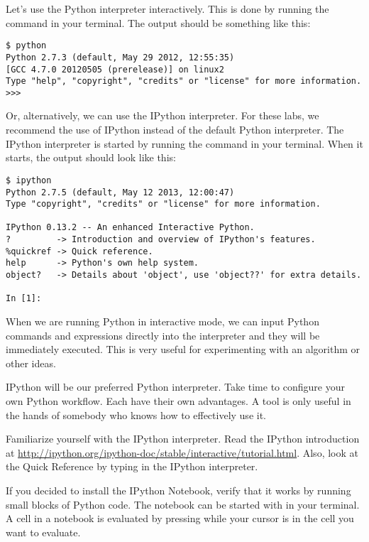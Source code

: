 Let's use the Python interpreter interactively.
This is done by running the command  in your terminal.
The output should be something like this:
\begin{lstlisting}
$ python
Python 2.7.3 (default, May 29 2012, 12:55:35)
[GCC 4.7.0 20120505 (prerelease)] on linux2
Type "help", "copyright", "credits" or "license" for more information.
>>>
\end{lstlisting}
Or, alternatively, we can use the IPython interpreter.
For these labs, we recommend the use of IPython instead of the default Python interpreter.
The IPython interpreter is started by running the command  in your terminal.
When it starts, the output should look like this:
\begin{lstlisting}
$ ipython
Python 2.7.5 (default, May 12 2013, 12:00:47)
Type "copyright", "credits" or "license" for more information.

IPython 0.13.2 -- An enhanced Interactive Python.
?         -> Introduction and overview of IPython's features.
%quickref -> Quick reference.
help      -> Python's own help system.
object?   -> Details about 'object', use 'object??' for extra details.

In [1]:
\end{lstlisting}
When we are running Python in interactive mode, we can input Python commands and expressions directly into the interpreter and they will be immediately executed.
This is very useful for experimenting with an algorithm or other ideas.

IPython will be our preferred Python interpreter.  Take time to configure your own Python
workflow.  Each have their own advantages.  A tool is only useful in the hands of somebody
who knows how to effectively use it.
\begin{problem}
Familiarize yourself with the IPython interpreter.
Read the IPython introduction at \url{http://ipython.org/ipython-doc/stable/interactive/tutorial.html}.
Also, look at the Quick Reference by typing  in the IPython interpreter.

If you decided to install the IPython Notebook, verify that it works by running small blocks of Python code.
The notebook can be started with  in your terminal.
A cell in a notebook is evaluated by pressing  while your cursor is in the cell you want to evaluate.
\end{problem}
